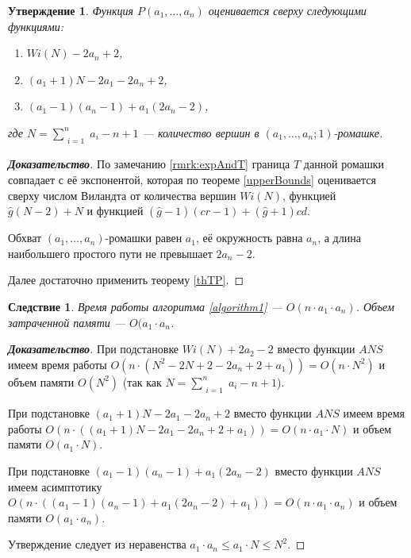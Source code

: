 \documentclass[12pt]{article}
\newtheorem{proposition}[theorem]{Утверждение}
\newtheorem{corollary}[theorem]{Следствие}
\begin{document}
\begin{proposition}
\label{upperBoundsP}
Функция $P(a_1, \dots, a_n)$ оценивается сверху следующими функциями:
\begin{enumerate}
\item $Wi(N) - 2a_n + 2$,
\item $(a_1 + 1)N - 2a_1 - 2a_n + 2$,
\item $(a_1 - 1)(a_n - 1) + a_1(2a_n - 2)$,
\end{enumerate}
где $N = \sum\limits_{\substack{i=1}}^n a_i - n + 1$ --- количество вершин в $(a_1, \dots, a_n; 1)$-ромашке.
\end{proposition}
\begin{proof}[\textbf{Доказательство}]
По замечанию \ref{rmrk:expAndT} граница $T$ данной ромашки совпадает с её экспонентой, которая по теореме \ref{upperBounds} оценивается сверху числом Виландта от количества вершин $Wi(N)$, функцией $\hat{g}(N - 2) + N$ и функцией $(\hat{g} - 1)(cr - 1) + (\hat{g} + 1) cd$.

Обхват $(a_1, \dots, a_n)$-ромашки равен $a_1$, её окружность равна $a_n$, а длина наибольшего простого пути не превышает $2a_n - 2$.

Далее достаточно применить теорему \ref{thTP}.
\end{proof}

\begin{corollary}
Время работы алгоритма \ref{algorithm1} --- $O(n \cdot a_1 \cdot a_n)$. Объем затраченной памяти --- $O(a_1 \cdot a_n$.
\end{corollary}
\begin{proof}[\textbf{Доказательство}]
При подстановке $Wi(N) + 2a_2 - 2$ вместо функции $ANS$ имеем время работы $O(n \cdot (N^2 - 2N + 2 - 2a_n + 2 + a_1)) = O(n \cdot N^2)$ и объем памяти $O(N^2)$ (так как $N = \sum\limits_{\substack{i=1}}^n a_i - n + 1$).

При подстановке $(a_1 + 1)N - 2a_1 - 2a_n + 2$ вместо функции $ANS$ имеем время работы $O(n \cdot ((a_1 + 1)N - 2a_1 - 2a_n + 2 + a_1)) = O(n \cdot a_1 \cdot N)$ и объем памяти $O(a_1 \cdot N)$.

При подстановке $(a_1 - 1)(a_n - 1) + a_1(2a_n - 2)$ вместо функции $ANS$ имеем асимптотику $O(n \cdot ((a_1 - 1)(a_n - 1) + a_1(2a_n - 2) + a_1)) = O(n \cdot a_1 \cdot a_n)$ и объем памяти $O(a_1 \cdot a_n)$.

Утверждение следует из неравенства $a_1 \cdot a_n \le a_1 \cdot N \le N^2$.
\end{proof}
\end{document}
